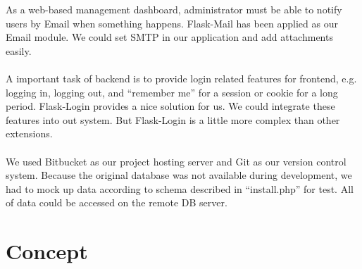 \documentclass[12pt,oneside,a4paper]{article}
\begin{document}
As a web-based management dashboard, administrator must be able to notify users by Email when something happens. Flask-Mail has been applied as our Email module. We could set SMTP in our application and add attachments easily.\\\\
A important task of backend is to provide login related features for frontend, e.g. logging in, logging out, and ``remember me'' for a session or cookie for a long period. Flask-Login provides a nice solution for us. We could integrate these features into out system. But Flask-Login is a little more complex than other extensions.\\\\
We used Bitbucket as our project hosting server and Git as our version control system. Because the original database was not available during development, we had to mock up data according to schema described in ``install.php'' for test. All of data could be accessed on the remote DB server.\\ 

\section{\LARGE Concept}
\end{document}
